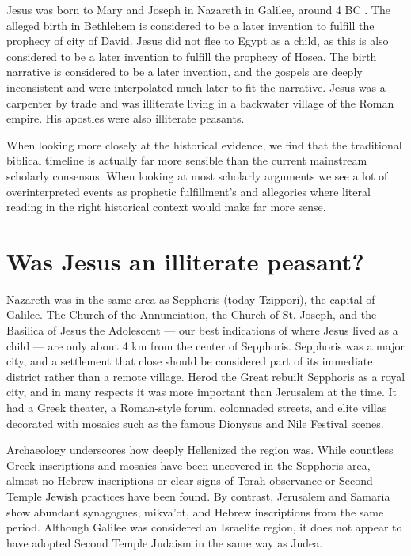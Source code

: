 Jesus was born to Mary and Joseph in Nazareth in Galilee, around 4 BC .
The alleged birth in Bethlehem is considered to be a later invention to fulfill the prophecy of city of David.
Jesus did not flee to Egypt as a child, as this is also considered to be a later invention to fulfill the prophecy of Hosea.
The birth narrative is considered to be a later invention, and the gospels are deeply inconsistent and were interpolated much later to fit the narrative.
Jesus was a carpenter by trade and was illiterate living in a backwater village of the Roman empire.
His apostles were also illiterate peasants.

When looking more closely at the historical evidence, we find that the traditional biblical timeline is actually far more sensible than the current mainstream scholarly consensus.
When looking at most scholarly arguments we see a lot of overinterpreted events as prophetic fulfillment's and allegories where literal reading in the right historical context would make far more sense.

\section{Was Jesus an illiterate peasant?}\label{sec:nazareth-was-not-a-backwater-village.}

Nazareth was in the same area as Sepphoris (today Tzippori), the capital of Galilee.
The Church of the Annunciation, the Church of St. Joseph, and the Basilica of Jesus the Adolescent — our best indications of where Jesus lived as a child — are only about 4 km from the center of Sepphoris.
Sepphoris was a major city, and a settlement that close should be considered part of its immediate district rather than a remote village.
Herod the Great rebuilt Sepphoris as a royal city, and in many respects it was more important than Jerusalem at the time.
It had a Greek theater, a Roman-style forum, colonnaded streets, and elite villas decorated with mosaics such as the famous Dionysus and Nile Festival scenes.

Archaeology underscores how deeply Hellenized the region was.
While countless Greek inscriptions and mosaics have been uncovered in the Sepphoris area, almost no Hebrew inscriptions or clear signs of Torah observance or Second Temple Jewish practices have been found.
By contrast, Jerusalem and Samaria show abundant synagogues, mikva’ot, and Hebrew inscriptions from the same period.
Although Galilee was considered an Israelite region, it does not appear to have adopted Second Temple Judaism in the same way as Judea.

